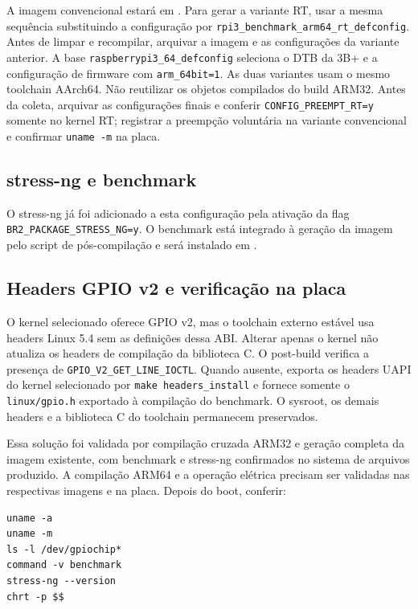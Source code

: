 \documentclass[11pt,a4paper]{article}
\begin{document}
A imagem convencional estará em . Para gerar a
variante RT, usar a mesma sequência substituindo a configuração por
\texttt{rpi3\_benchmark\_arm64\_rt\_defconfig}. Antes de limpar e recompilar,
arquivar a imagem e as configurações da variante anterior. A base \texttt{raspberrypi3\_64\_defconfig} seleciona o DTB da
3B+ e a configuração de firmware com \texttt{arm\_64bit=1}. As duas variantes
usam o mesmo toolchain AArch64. Não reutilizar os objetos compilados do build
ARM32. Antes da coleta, arquivar as configurações finais e conferir
\texttt{CONFIG\_PREEMPT\_RT=y} somente no kernel RT; registrar a preempção
voluntária na variante convencional e confirmar \texttt{uname -m} na placa.

\subsection{stress-ng e benchmark}

O stress-ng já foi adicionado a esta configuração pela ativação da flag
\texttt{BR2\_PACKAGE\_STRESS\_NG=y}. O benchmark está integrado à geração da
imagem pelo script de pós-compilação e será instalado em .

\subsection{Headers GPIO v2 e verificação na placa}

O kernel selecionado oferece GPIO v2, mas o toolchain externo estável usa
headers Linux 5.4 sem as definições dessa ABI. Alterar apenas o kernel não
atualiza os headers de compilação da biblioteca C. O post-build verifica a
presença de \texttt{GPIO\_V2\_GET\_LINE\_IOCTL}. Quando ausente, exporta os
headers UAPI do kernel selecionado por \texttt{make headers\_install} e fornece
somente o \texttt{linux/gpio.h} exportado à compilação do benchmark. O sysroot,
os demais headers e a biblioteca C do toolchain permanecem preservados.

Essa solução foi validada por compilação cruzada ARM32 e geração completa da
imagem existente, com benchmark e stress-ng confirmados no sistema de arquivos
produzido. A compilação ARM64 e a operação elétrica precisam ser
validadas nas respectivas imagens e na placa. Depois do boot, conferir:
\begin{lstlisting}
uname -a
uname -m
ls -l /dev/gpiochip*
command -v benchmark
stress-ng --version
chrt -p $$
\end{lstlisting}
\end{document}
